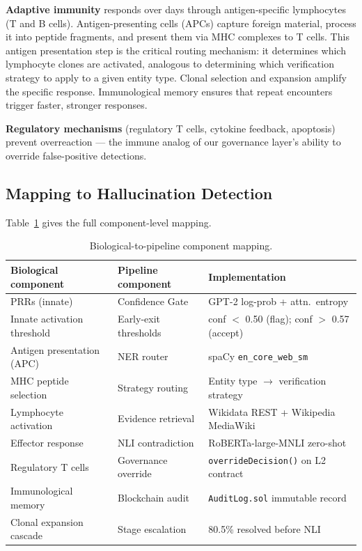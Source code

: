 \documentclass[11pt,a4paper]{article}
\begin{document}
\textbf{Adaptive immunity} responds over days through antigen-specific
lymphocytes (T and B cells). Antigen-presenting cells (APCs) capture foreign
material, process it into peptide fragments, and present them via MHC complexes
to T cells. This antigen presentation step is the critical routing mechanism: it
determines which lymphocyte clones are activated, analogous to determining which
verification strategy to apply to a given entity type. Clonal selection and
expansion amplify the specific response. Immunological memory ensures that repeat
encounters trigger faster, stronger responses.

\textbf{Regulatory mechanisms} (regulatory T cells, cytokine feedback,
apoptosis) prevent overreaction --- the immune analog of our governance layer's
ability to override false-positive detections.

\subsection{Mapping to Hallucination Detection}

Table~\ref{tab:biomap} gives the full component-level mapping.

\begin{table}[htb]
\centering
\caption{Biological-to-pipeline component mapping.}
\label{tab:biomap}
\small
\begin{tabular}{lll}
\toprule
\textbf{Biological component} & \textbf{Pipeline component} & \textbf{Implementation} \\
\midrule
PRRs (innate)               & Confidence Gate        & GPT-2 log-prob + attn.\ entropy \\
Innate activation threshold & Early-exit thresholds  & conf $<$ 0.50 (flag); conf $>$ 0.57 (accept) \\
Antigen presentation (APC)  & NER router             & spaCy \texttt{en\_core\_web\_sm} \\
MHC peptide selection       & Strategy routing       & Entity type $\to$ verification strategy \\
Lymphocyte activation       & Evidence retrieval     & Wikidata REST + Wikipedia MediaWiki \\
Effector response           & NLI contradiction      & RoBERTa-large-MNLI zero-shot \\
Regulatory T cells          & Governance override    & \texttt{overrideDecision()} on L2 contract \\
Immunological memory        & Blockchain audit       & \texttt{AuditLog.sol} immutable record \\
Clonal expansion cascade    & Stage escalation       & 80.5\% resolved before NLI \\
\bottomrule
\end{tabular}
\end{table}
\end{document}
